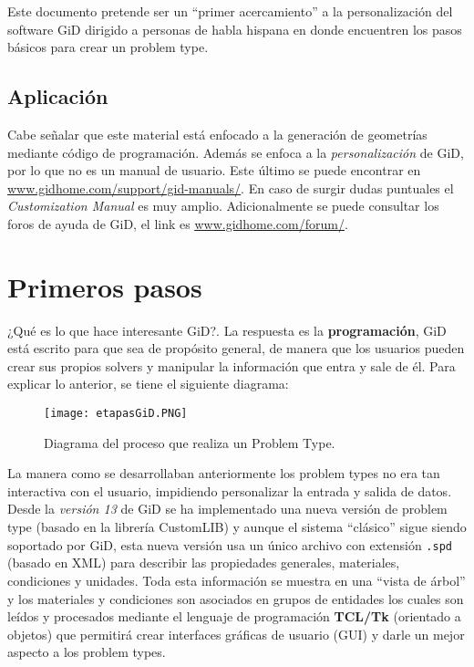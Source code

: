 \documentclass[10pt, a4paper, twocolumn]{article}
\begin{document}
Este documento pretende ser un ``primer acercamiento'' a la personalización del software GiD dirigido a personas de habla hispana en donde encuentren los pasos básicos para crear un problem type.

\subsection{Aplicación}

Cabe señalar que este material está enfocado a la generación de geometrías mediante código de programación. Además se enfoca a la \textit{personalización} de GiD, por lo que no es un manual de usuario. Este último se puede encontrar en \textcolor{BlueGiD}{\underline{\url{www.gidhome.com/support/gid-manuals/}}}. En caso de surgir dudas puntuales el \textit{Customization Manual} es muy amplio. Adicionalmente se puede consultar los foros de ayuda de GiD, el link es \textcolor{BlueGiD}{\underline{\url{www.gidhome.com/forum/}}}.

\newpage

\section{Primeros pasos}

¿Qué es lo que hace interesante GiD?. La respuesta es la \textbf{programación}, GiD está escrito para que sea de propósito general, de manera que los usuarios pueden crear sus propios solvers y manipular la información que entra y sale de él. Para explicar lo anterior, se tiene el siguiente diagrama:

\begin{figure}[hbtp!]
	\centering
	\texttt{[image: etapasGiD.PNG]}
	\caption{Diagrama del proceso que realiza un Problem Type.\label{fig:diagramaProcesos}}
\end{figure}

La manera como se desarrollaban anteriormente los problem types no era tan interactiva con el usuario, impidiendo personalizar la entrada y salida de datos. Desde la \textit{versión 13} de GiD se ha implementado una nueva versión de problem type (basado en la librería CustomLIB) y aunque el sistema ``clásico'' sigue siendo soportado por GiD, esta nueva versión usa un único archivo con extensión \texttt{.spd} (basado en XML) para describir las propiedades generales, materiales, condiciones y unidades. Toda esta información se muestra en una ``vista de árbol'' y los materiales y condiciones son asociados en grupos de entidades los cuales son leídos y procesados mediante el lenguaje de programación \textbf{TCL/Tk} (orientado a objetos) que permitirá crear interfaces gráficas de usuario (GUI) y darle un mejor aspecto a los problem types.
\end{document}

